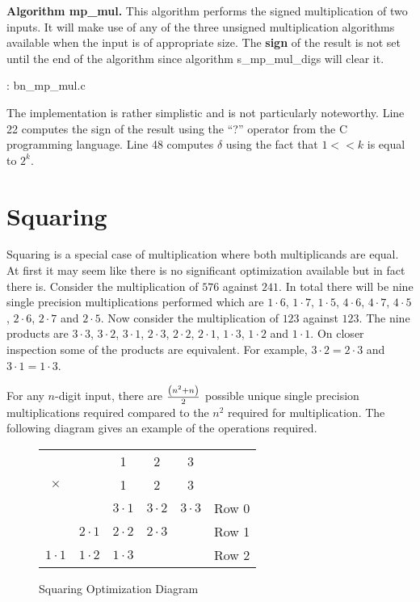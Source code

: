 \documentclass[b5paper]{book}
\begin{document}
\textbf{Algorithm mp\_mul.}
This algorithm performs the signed multiplication of two inputs.  It will make use of any of the three unsigned multiplication algorithms 
available when the input is of appropriate size.  The \textbf{sign} of the result is not set until the end of the algorithm since algorithm
s\_mp\_mul\_digs will clear it.  

\vspace{+3mm}\begin{small}
\hspace{-5.1mm}{\bf File}: bn\_mp\_mul.c
\vspace{-3mm}
\begin{alltt}
\end{alltt}
\end{small}

The implementation is rather simplistic and is not particularly noteworthy.  Line 22 computes the sign of the result using the ``?'' 
operator from the C programming language.  Line 48 computes $\delta$ using the fact that $1 << k$ is equal to $2^k$.  

\section{Squaring}
\label{sec:basesquare}

Squaring is a special case of multiplication where both multiplicands are equal.  At first it may seem like there is no significant optimization
available but in fact there is.  Consider the multiplication of $576$ against $241$.  In total there will be nine single precision multiplications
performed which are $1\cdot 6$, $1 \cdot 7$, $1 \cdot 5$, $4 \cdot 6$, $4 \cdot 7$, $4 \cdot 5$, $2 \cdot  6$, $2 \cdot 7$ and $2 \cdot 5$.  Now consider 
the multiplication of $123$ against $123$.  The nine products are $3 \cdot 3$, $3 \cdot 2$, $3 \cdot 1$, $2 \cdot 3$, $2 \cdot 2$, $2 \cdot 1$, 
$1 \cdot 3$, $1 \cdot 2$ and $1 \cdot 1$.  On closer inspection some of the products are equivalent.  For example, $3 \cdot 2 = 2 \cdot 3$ 
and $3 \cdot 1 = 1 \cdot 3$. 

For any $n$-digit input, there are ${{\left (n^2 + n \right)}\over 2}$ possible unique single precision multiplications required compared to the $n^2$
required for multiplication.  The following diagram gives an example of the operations required.

\begin{figure}[here]
\begin{center}
\begin{tabular}{ccccc|c}
&&1&2&3&\\
$\times$ &&1&2&3&\\
\hline && $3 \cdot 1$ & $3 \cdot 2$ & $3 \cdot 3$ & Row 0\\
       & $2 \cdot 1$  & $2 \cdot 2$ & $2 \cdot 3$ && Row 1 \\
         $1 \cdot 1$  & $1 \cdot 2$ & $1 \cdot 3$ &&& Row 2 \\
\end{tabular}
\end{center}
\caption{Squaring Optimization Diagram}
\end{figure}
\end{document}

